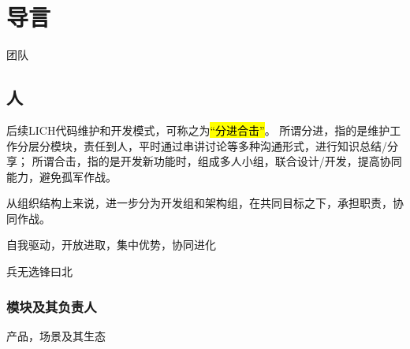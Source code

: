 \chapter{导言}

团队

\section{人}

后续LICH代码维护和开发模式，可称之为\hl{“分进合击”}。
所谓分进，指的是维护工作分层分模块，责任到人，平时通过串讲讨论等多种沟通形式，进行知识总结/分享；
所谓合击，指的是开发新功能时，组成多人小组，联合设计/开发，提高协同能力，避免孤军作战。

从组织结构上来说，进一步分为开发组和架构组，在共同目标之下，承担职责，协同作战。

自我驱动，开放进取，集中优势，协同进化

\begin{shadequote}
兵无选锋曰北
\end{shadequote}

\subsection{模块及其负责人}

产品，场景及其生态

